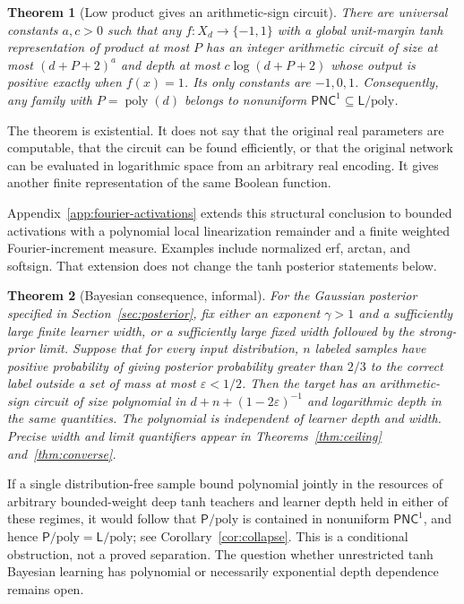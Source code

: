 \documentclass[11pt]{article}
\newtheorem{theorem}{Theorem}[section]
\theoremstyle{remark}\newtheorem{remark}[theorem]{Remark}
\newcommand{\poly}{\operatorname{poly}}
\newcommand{\PNC}{\mathsf{PNC}}
\newcommand{\Lpoly}{\mathsf L/\mathrm{poly}}
\newcommand{\Ppoly}{\mathsf P/\mathrm{poly}}
\begin{document}
\begin{theorem}[Low product gives an arithmetic-sign circuit]
\label{thm:main}
There are universal constants $a,c>0$ such that any $f:X_d\to\{-1,1\}$
with a global unit-margin tanh representation of product at most $P$
has an integer arithmetic circuit of size at most $(d+P+2)^a$ and
depth at most $c\log(d+P+2)$ whose output is positive exactly when
$f(x)=1$. Its only constants are $-1,0,1$.
Consequently, any family with $P=\poly(d)$ belongs to nonuniform
$\PNC^1\subseteq\Lpoly$.
\end{theorem}

The theorem is existential. It does not say that the original real
parameters are computable, that the circuit can be found efficiently,
or that the original network can be evaluated in logarithmic space
from an arbitrary real encoding. It gives another finite representation
of the same Boolean function.

Appendix~\ref{app:fourier-activations} extends this structural conclusion
to bounded activations with a polynomial local linearization remainder
and a finite weighted Fourier-increment measure. Examples include
normalized erf, arctan, and softsign. That extension does not change
the tanh posterior statements below.

\begin{theorem}[Bayesian consequence, informal]
\label{thm:intro-converse}
For the Gaussian posterior specified in Section~\ref{sec:posterior},
fix either an exponent $\gamma>1$ and a sufficiently large finite
learner width, or a sufficiently large fixed width followed by the
strong-prior limit. Suppose that for every input distribution, $n$
labeled samples have positive probability of giving posterior
probability greater than $2/3$ to the correct label outside a set of
mass at most $\varepsilon<1/2$. Then the target has an arithmetic-sign
circuit of size polynomial in $d+n+(1-2\varepsilon)^{-1}$ and
logarithmic depth in the same quantities. The polynomial is independent
of learner depth and width. Precise width and limit quantifiers appear
in Theorems~\ref{thm:ceiling} and~\ref{thm:converse}.
\end{theorem}

If a single distribution-free sample bound polynomial jointly in the
resources of arbitrary bounded-weight deep tanh teachers and learner
depth held in either of these regimes, it would follow that
$\Ppoly$ is contained in nonuniform $\PNC^1$, and hence
$\Ppoly=\Lpoly$; see Corollary~\ref{cor:collapse}. This is a
conditional obstruction, not a proved separation. The question whether
unrestricted tanh Bayesian learning has polynomial or necessarily
exponential depth dependence remains open.
\end{document}
